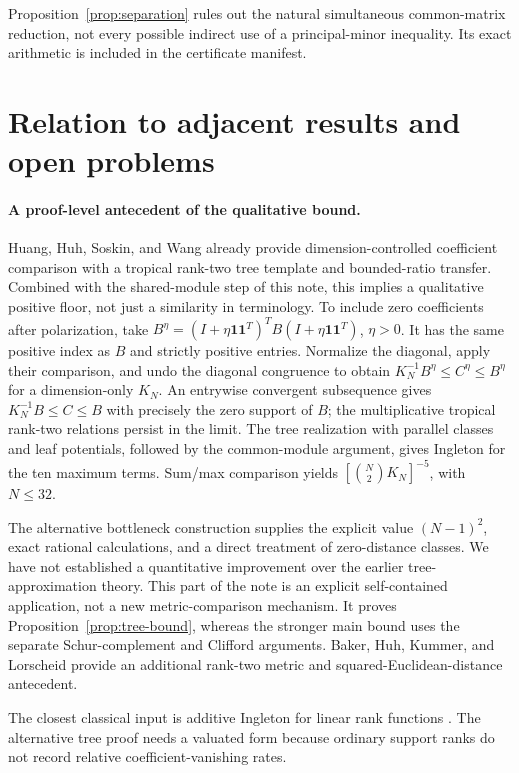 \documentclass[11pt]{article}
\theoremstyle{remark}
\newcommand{\one}{\mathbf{1}}
\begin{document}
Proposition~\ref{prop:separation} rules out the natural simultaneous
common-matrix reduction, not every possible indirect use of a
principal-minor inequality.  Its exact arithmetic is included in the
certificate manifest.

\section{Relation to adjacent results and open problems}

\paragraph{A proof-level antecedent of the qualitative bound.}
Huang, Huh, Soskin, and Wang
\cite[Proposition~3.1, Corollary~3.4, and Lemma~3.5]{HuangHuhSoskinWang2025}
already provide dimension-controlled coefficient comparison with a
tropical rank-two tree template and bounded-ratio transfer.  Combined
with the shared-module step of this note, this implies a qualitative
positive floor, not just a similarity in terminology.
To include zero coefficients after polarization, take
$B^\eta=(I+\eta\one\one^T)^TB(I+\eta\one\one^T)$, $\eta>0$.
It has the same positive index as $B$ and strictly positive entries.
Normalize the diagonal, apply their comparison, and undo the diagonal
congruence to obtain $K_N^{-1}B^\eta\le C^\eta\le B^\eta$ for a
dimension-only $K_N$.  An entrywise convergent subsequence gives
$K_N^{-1}B\le C\le B$ with precisely the zero support of $B$;
the multiplicative tropical rank-two relations persist in the limit.
The tree realization with parallel classes and leaf potentials, followed
by the common-module argument, gives Ingleton for the ten maximum terms.
Sum/max comparison yields $[\binom N2K_N]^{-5}$, with $N\le32$.

The alternative bottleneck construction supplies the explicit value $(N-1)^2$,
exact rational calculations, and a direct treatment of zero-distance
classes.  We have not established a quantitative improvement over the
earlier tree-approximation theory.  This part of the note is an explicit
self-contained application, not a new metric-comparison mechanism.
It proves Proposition~\ref{prop:tree-bound}, whereas the stronger main
bound uses the separate Schur-complement and Clifford arguments.
Baker, Huh, Kummer, and Lorscheid
\cite[Theorem~1.2 and Section~4]{BakerHuhKummerLorscheid2026} provide
an additional rank-two metric and squared-Euclidean-distance antecedent.

The closest classical input is additive Ingleton for linear rank functions
\cite{Ingleton1971}.  The alternative tree proof needs a valuated form because ordinary
support ranks do not record relative coefficient-vanishing rates.
\end{document}
